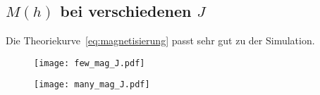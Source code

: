 		\subsection{$M\left(h\right)$ bei verschiedenen $J$}
		Die Theoriekurve~\eqref{eq:magnetisierung} passt sehr gut zu der Simulation.
		\begin{figure}[ht]
				\centering
				\texttt{[image: few\_mag\_J.pdf]}
		\end{figure}
		\begin{figure}[ht]
				\centering
				\texttt{[image: many\_mag\_J.pdf]}
		\end{figure}
		\FloatBarrier{}

